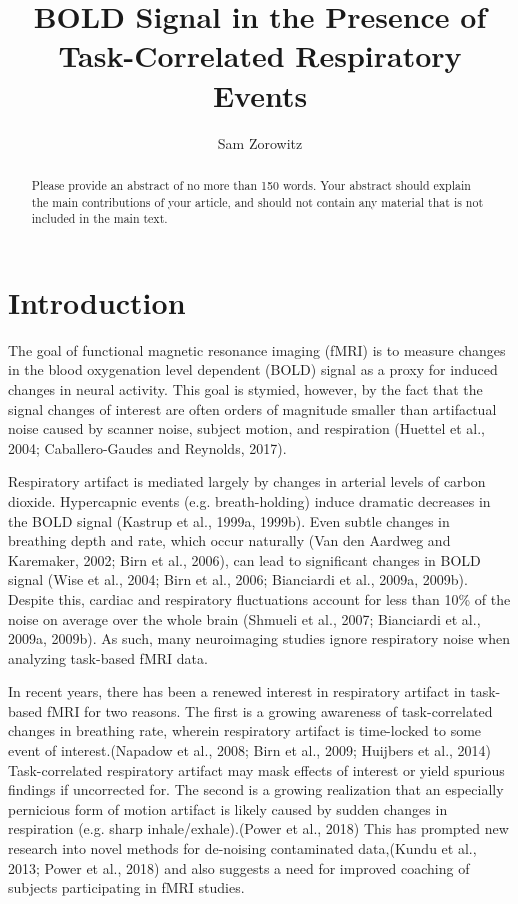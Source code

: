 \documentclass[9pt]{NEU502b-fmri}
\title{BOLD Signal in the Presence of Task-Correlated Respiratory Events}
\author[1]{Sam Zorowitz}
\begin{document}
\maketitle

\begin{abstract}
Please provide an abstract of no more than 150 words. Your abstract should explain the main contributions of your article, and should not contain any material that is not included in the main text.
\end{abstract}


\section{Introduction}

The goal of functional magnetic resonance imaging (fMRI) is to measure changes in the blood oxygenation level dependent (BOLD) signal as a proxy for induced changes in neural activity. This goal is stymied, however, by the fact that the signal changes of interest are often orders of magnitude smaller than artifactual noise caused by scanner noise, subject motion, and respiration (Huettel et al., 2004; Caballero-Gaudes and Reynolds, 2017).

Respiratory artifact is mediated largely by changes in arterial levels of carbon dioxide. Hypercapnic events (e.g. breath-holding) induce dramatic decreases in the BOLD signal (Kastrup et al., 1999a, 1999b). Even subtle changes in breathing depth and rate, which occur naturally (Van den Aardweg and Karemaker, 2002; Birn et al., 2006), can lead to significant changes in BOLD signal (Wise et al., 2004; Birn et al., 2006; Bianciardi et al., 2009a, 2009b). Despite this, cardiac and respiratory fluctuations account for less than 10\% of the noise on average over the whole brain (Shmueli et al., 2007; Bianciardi et al., 2009a, 2009b). As such, many neuroimaging studies ignore respiratory noise when analyzing task-based fMRI data.

In recent years, there has been a renewed interest in respiratory artifact in task-based fMRI for two reasons. The first is a growing awareness of task-correlated changes in breathing rate, wherein respiratory artifact is time-locked to some event of interest.(Napadow et al., 2008; Birn et al., 2009; Huijbers et al., 2014) Task-correlated respiratory artifact may mask effects of interest or yield spurious findings if uncorrected for. The second is a growing realization that an especially pernicious form of motion artifact is likely caused by sudden changes in respiration (e.g. sharp inhale/exhale).(Power et al., 2018) This has prompted new research into novel methods for de-noising contaminated data,(Kundu et al., 2013; Power et al., 2018) and also suggests a need for improved coaching of subjects participating in fMRI studies.
\end{document}
